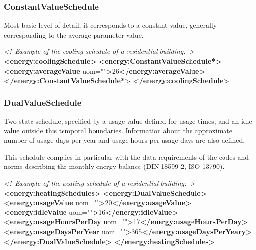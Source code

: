 \documentclass[a4paper,12pt]{article}
\newenvironment{Shaded}{}{}
\newcommand{\KeywordTok}[1]{\textcolor[rgb]{0.00,0.44,0.13}{\textbf{{#1}}}}
\newcommand{\StringTok}[1]{\textcolor[rgb]{0.25,0.44,0.63}{{#1}}}
\newcommand{\CommentTok}[1]{\textcolor[rgb]{0.38,0.63,0.69}{\textit{{#1}}}}
\newcommand{\OtherTok}[1]{\textcolor[rgb]{0.00,0.44,0.13}{{#1}}}
\newcommand{\ErrorTok}[1]{\textcolor[rgb]{1.00,0.00,0.00}{\textbf{{#1}}}}
\newcommand{\NormalTok}[1]{{#1}}
\begin{document}
\subsubsection{ConstantValueSchedule}\label{constantvalueschedule}

Most basic level of detail, it corresponds to a constant value,
generally corresponding to the average parameter value.

\begin{Shaded}
\begin{Highlighting}[]
\CommentTok{<!--Example of the cooling schedule of a residential building:-->}
\KeywordTok{<energy:coolingSchedule>}
    \KeywordTok{<energy:ConstantValueSchedule}\ErrorTok{*}\KeywordTok{>}
        \KeywordTok{<energy:averageValue}\OtherTok{ uom=}\StringTok{""}\KeywordTok{>}\NormalTok{26}\KeywordTok{</energy:averageValue>}
    \KeywordTok{</energy:ConstantValueSchedule}\ErrorTok{*}\KeywordTok{>}
\KeywordTok{</energy:coolingSchedule>}
\end{Highlighting}
\end{Shaded}

\subsubsection{DualValueSchedule}\label{dualvalueschedule}

Two-state schedule, specified by a usage value defined for usage times,
and an idle value outside this temporal boundaries. Information about
the approximate number of usage days per year and usage hours per usage
days are also defined.

This schedule complies in particular with the data requirements of the
codes and norms describing the monthly energy balance (DIN 18599-2, ISO
13790).

\begin{Shaded}
\begin{Highlighting}[]
\CommentTok{<!--Example of the heating schedule of a residential building:-->}
\KeywordTok{<energy:heatingSchedules>}
    \KeywordTok{<energy:DualValueSchedule>}
        \KeywordTok{<energy:usageValue}\OtherTok{ uom=}\StringTok{""}\KeywordTok{>}\NormalTok{20}\KeywordTok{</energy:usageValue>}
        \KeywordTok{<energy:idleValue}\OtherTok{ uom=}\StringTok{""}\KeywordTok{>}\NormalTok{16}\KeywordTok{</energy:idleValue>}
        \KeywordTok{<energy:usageHoursPerDay}\OtherTok{ uom=}\StringTok{""}\KeywordTok{>}\NormalTok{17}\KeywordTok{</energy:usageHoursPerDay>}
        \KeywordTok{<energy:usageDaysPerYear}\OtherTok{ uom=}\StringTok{""}\KeywordTok{>}\NormalTok{365}\KeywordTok{</energy:usageDaysPerYeary>}
    \KeywordTok{</energy:DualValueSchedule>}
\KeywordTok{</energy:heatingSchedules>}
\end{Highlighting}
\end{Shaded}
\end{document}
